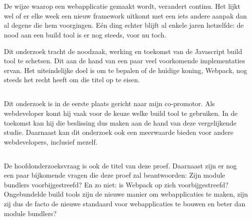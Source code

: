 \chapter{}
\label{ch:inleiding}

De wijze waarop een webapplicatie gemaakt wordt, verandert continu. Het lijkt wel of er elke week een nieuw framework uitkomt met een iets andere aanpak dan al degene die hem voorgingen. Eén ding echter blijft al enkele jaren hetzelfde: de nood aan een build tool is er nog steeds, voor nu toch.

Dit onderzoek tracht de noodzaak, werking en toekomst van de Javascript build tool te schetsen. Dit aan de hand van een paar veel voorkomende implementaties ervan. Het uiteindelijke doel is om te bepalen of de huidige koning, Webpack, nog steeds het recht heeft om die titel op te eisen.

\section{}
\label{sec:probleemstelling}

Dit onderzoek is in de eerste plaats gericht naar mijn co-promotor. Als webdeveloper komt hij vaak voor de keuze welke build tool te gebruiken. In de toekomst kan hij die beslissing dus maken aan de hand van deze vergelijkende studie. Daarnaast kan dit onderzoek ook een meerwaarde bieden voor andere webdevelopers, inclusief mezelf.

\section{}
\label{sec:onderzoeksvraag}

De hoofdonderzoeksvraag is ook de titel van deze proef. Daarnaast zijn er nog een paar bijkomende vragen die deze proef zal beantwoorden: Zijn module bundlers voorbijgestreefd? En zo niet: is Webpack op zich voorbijgestreefd? Ongebundelde build tools zijn de nieuwe manier om webapplicaties te maken, zijn zij dus de facto de nieuwe standaard voor webapplicaties te bouwen en beter dan module bundlers?

\section{}
\label{sec:onderzoeksdoelstelling}

